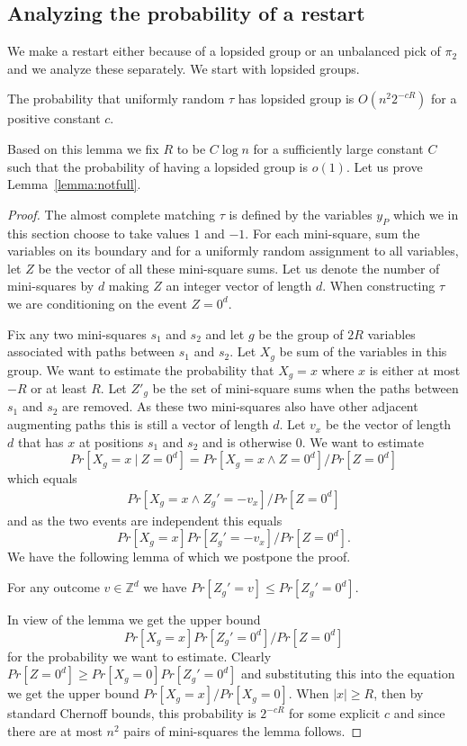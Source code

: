 \documentclass{theoretics}
\begin{document}
\subsection{Analyzing the probability of a restart}

We make a restart either because of a lopsided
group or an unbalanced pick of $\pi_2$ and we analyze
these separately.  We start with lopsided groups.

\begin{lemma}\label{lemma:notfull}
The probability that uniformly random 
$\tau$ has lopsided group is $O(n^2 2^{-cR})$
for a positive constant $c$.
\end{lemma}

Based on this lemma we fix $R$ to be $C \log n$ for
a sufficiently large constant $C$ such that the probability of 
having a lopsided group is $o(1)$.  Let us
prove Lemma~\ref{lemma:notfull}.

\begin{proof}
The almost complete matching $\tau$ is defined by the 
variables $y_P$ which we in this section choose
to take values $1$ and $-1$.  For each mini-square, sum the variables
on its boundary and for a uniformly random assignment to
all variables, let $Z$ be the vector of all these mini-square sums.
Let us denote the number of mini-squares by $d$ making
$Z$ an integer  vector of length $d$. 
When constructing $\tau$ we are conditioning on the event $Z=0^d$.

Fix any two mini-squares $s_1$ and $s_2$ and let
$g$ be the group of $2R$ variables associated with
paths between $s_1$ and $s_2$.
Let $X_g$ be sum of the variables
in this group.  We want to estimate
the probability that $X_g= x$ where $x$ is
either at most $-R$ or at least $R$.  Let $Z'_g$ be the set of mini-square
sums when the paths between $s_1$ and $s_2$ are
removed.  As these two mini-squares also have other
adjacent augmenting paths this is still a vector of
length $d$.  Let $v_x$ be the
vector of length $d$ that has $x$ at positions $s_1$ and $s_2$
and is otherwise $0$.  We want to estimate
$$
Pr[X_g=x \ |\ Z=0^d]=Pr[X_g=x \land Z=0^d]/Pr[Z=0^d]
$$
which equals
\begin{eqnarray*} 
 Pr[X_g=x \land Z_g'= -v_x]/Pr[Z=0^d]
\end{eqnarray*}
and as the two events are independent this equals
$$
Pr[X_g=x] Pr[Z_g'= -v_x]/Pr[Z=0^d].
$$
We have the following
lemma of which we postpone the proof.

\begin{lemma}\label{lemma:max0}
For any outcome $v \in \mathbb{Z}^d$ we have
$Pr[Z_g'=v] \leq Pr[Z_g'=0^d]$.  
\end{lemma}

In view of the lemma we get the upper bound
$$Pr[X_g=x] Pr[Z_g'= 0^d]/Pr[Z=0^d]
$$
for the probability we want to estimate.
Clearly $Pr[Z=0^d] \geq Pr[X_g=0] Pr[Z_g'= 0^d]$
and substituting this into the equation we get
the upper bound $Pr[X_g=x] / Pr [X_g=0]$.
When $|x| \geq R$, then by standard Chernoff bounds,
this probability is $2^{-cR}$
for some explicit $c$ and since there are at
most $n^2$ pairs of mini-squares the lemma follows.
\end{proof}
\end{document}

